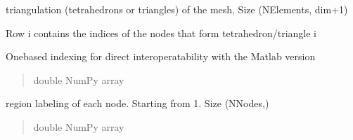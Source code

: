 \documentclass[letterpaper,10pt,english]{sphinxmanual}
\begin{document}
\begin{fulllineitems}
\begin{fulllineitems}
\begin{quote}
\begin{description}
\end{description}\end{quote}

\end{fulllineitems}


\begin{fulllineitems}
\label{\detokenize{_autosummary/nirfasterff.base.fluor_mesh.fluormesh:nirfasterff.base.fluor_mesh.fluormesh.elements}}
\pysigstartsignatures
\pysigline
{}
\pysigstopsignatures
\sphinxAtStartPar
triangulation (tetrahedrons or triangles) of the mesh, Size (NElements, dim+1)

\sphinxAtStartPar
Row i contains the indices of the nodes that form tetrahedron/triangle i

\sphinxAtStartPar
One\sphinxhyphen{}based indexing for direct interoperatability with the Matlab version
\begin{quote}\begin{description}
\sphinxAtStartPar
double NumPy array

\end{description}\end{quote}

\end{fulllineitems}


\begin{fulllineitems}
\label{\detokenize{_autosummary/nirfasterff.base.fluor_mesh.fluormesh:nirfasterff.base.fluor_mesh.fluormesh.region}}
\pysigstartsignatures
\pysigline
{}
\pysigstopsignatures
\sphinxAtStartPar
region labeling of each node. Starting from 1. Size (NNodes,)
\begin{quote}\begin{description}
\sphinxAtStartPar
double NumPy array

\end{description}\end{quote}

\end{fulllineitems}



\end{fulllineitems}
\end{document}
